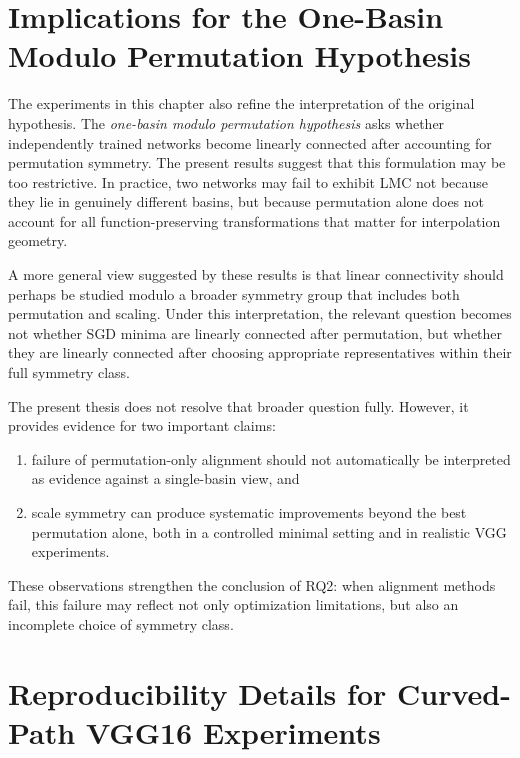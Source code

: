 \documentclass[11pt,a4paper]{report}
\begin{document}
\section{Implications for the One-Basin Modulo Permutation Hypothesis}

The experiments in this chapter also refine the interpretation of the original hypothesis. The \textit{one-basin modulo permutation hypothesis} asks whether independently trained networks become linearly connected after accounting for permutation symmetry. The present results suggest that this formulation may be too restrictive. In practice, two networks may fail to exhibit LMC not because they lie in genuinely different basins, but because permutation alone does not account for all function-preserving transformations that matter for interpolation geometry.

A more general view suggested by these results is that linear connectivity should perhaps be studied modulo a broader symmetry group that includes both permutation and scaling. Under this interpretation, the relevant question becomes not whether SGD minima are linearly connected after permutation, but whether they are linearly connected after choosing appropriate representatives within their full symmetry class.

The present thesis does not resolve that broader question fully. However, it provides evidence for two important claims:
\begin{enumerate}
    \item failure of permutation-only alignment should not automatically be interpreted as evidence against a single-basin view, and
    \item scale symmetry can produce systematic improvements beyond the best permutation alone, both in a controlled minimal setting and in realistic VGG experiments.
\end{enumerate}

These observations strengthen the conclusion of RQ2: when alignment methods fail, this failure may reflect not only optimization limitations, but also an incomplete choice of symmetry class.




\appendix

\section{Reproducibility Details for Curved-Path VGG16 Experiments}
\label{app:curved_path_repro}
\end{document}
